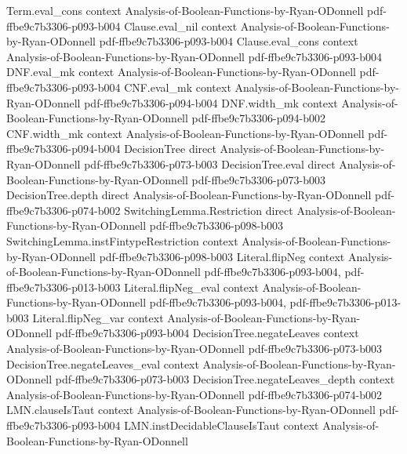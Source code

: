 \begin{lemma}
\proofstep
  {Term.eval_cons}
  {context}
  {Analysis-of-Boolean-Functions-by-Ryan-ODonnell}
  {pdf-ffbe9c7b3306-p093-b004}
\proofstep
  {Clause.eval_nil}
  {context}
  {Analysis-of-Boolean-Functions-by-Ryan-ODonnell}
  {pdf-ffbe9c7b3306-p093-b004}
\proofstep
  {Clause.eval_cons}
  {context}
  {Analysis-of-Boolean-Functions-by-Ryan-ODonnell}
  {pdf-ffbe9c7b3306-p093-b004}
\proofstep
  {DNF.eval_mk}
  {context}
  {Analysis-of-Boolean-Functions-by-Ryan-ODonnell}
  {pdf-ffbe9c7b3306-p093-b004}
\proofstep
  {CNF.eval_mk}
  {context}
  {Analysis-of-Boolean-Functions-by-Ryan-ODonnell}
  {pdf-ffbe9c7b3306-p094-b004}
\proofstep
  {DNF.width_mk}
  {context}
  {Analysis-of-Boolean-Functions-by-Ryan-ODonnell}
  {pdf-ffbe9c7b3306-p094-b002}
\proofstep
  {CNF.width_mk}
  {context}
  {Analysis-of-Boolean-Functions-by-Ryan-ODonnell}
  {pdf-ffbe9c7b3306-p094-b004}
\proofstep
  {DecisionTree}
  {direct}
  {Analysis-of-Boolean-Functions-by-Ryan-ODonnell}
  {pdf-ffbe9c7b3306-p073-b003}
\proofstep
  {DecisionTree.eval}
  {direct}
  {Analysis-of-Boolean-Functions-by-Ryan-ODonnell}
  {pdf-ffbe9c7b3306-p073-b003}
\proofstep
  {DecisionTree.depth}
  {direct}
  {Analysis-of-Boolean-Functions-by-Ryan-ODonnell}
  {pdf-ffbe9c7b3306-p074-b002}
\proofstep
  {SwitchingLemma.Restriction}
  {direct}
  {Analysis-of-Boolean-Functions-by-Ryan-ODonnell}
  {pdf-ffbe9c7b3306-p098-b003}
\proofstep
  {SwitchingLemma.instFintypeRestriction}
  {context}
  {Analysis-of-Boolean-Functions-by-Ryan-ODonnell}
  {pdf-ffbe9c7b3306-p098-b003}
\proofstep
  {Literal.flipNeg}
  {context}
  {Analysis-of-Boolean-Functions-by-Ryan-ODonnell}
  {pdf-ffbe9c7b3306-p093-b004,
    pdf-ffbe9c7b3306-p013-b003}
\proofstep
  {Literal.flipNeg_eval}
  {context}
  {Analysis-of-Boolean-Functions-by-Ryan-ODonnell}
  {pdf-ffbe9c7b3306-p093-b004,
    pdf-ffbe9c7b3306-p013-b003}
\proofstep
  {Literal.flipNeg_var}
  {context}
  {Analysis-of-Boolean-Functions-by-Ryan-ODonnell}
  {pdf-ffbe9c7b3306-p093-b004}
\proofstep
  {DecisionTree.negateLeaves}
  {context}
  {Analysis-of-Boolean-Functions-by-Ryan-ODonnell}
  {pdf-ffbe9c7b3306-p073-b003}
\proofstep
  {DecisionTree.negateLeaves_eval}
  {context}
  {Analysis-of-Boolean-Functions-by-Ryan-ODonnell}
  {pdf-ffbe9c7b3306-p073-b003}
\proofstep
  {DecisionTree.negateLeaves_depth}
  {context}
  {Analysis-of-Boolean-Functions-by-Ryan-ODonnell}
  {pdf-ffbe9c7b3306-p074-b002}
\proofstep
  {LMN.clauseIsTaut}
  {context}
  {Analysis-of-Boolean-Functions-by-Ryan-ODonnell}
  {pdf-ffbe9c7b3306-p093-b004}
\proofstep
  {LMN.instDecidableClauseIsTaut}
  {context}
  {Analysis-of-Boolean-Functions-by-Ryan-ODonnell}

\end{lemma}
